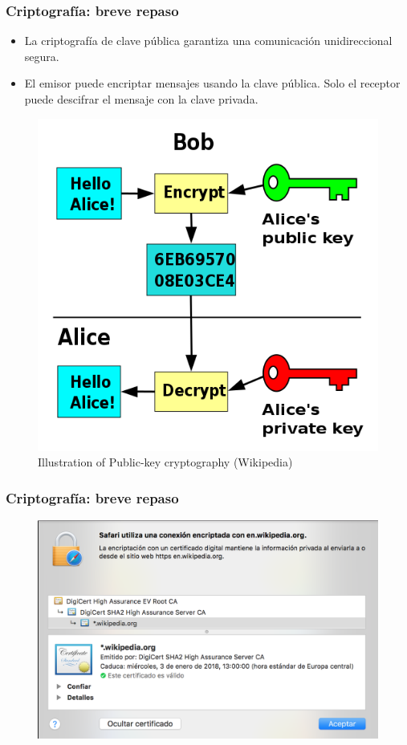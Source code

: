\documentclass[spanish, a4paper, 12pt, final, slideColor, nototal, colorBG, pdf, noaccumulate, darkblue] {beamer}
\begin{document}
\begin{frame}
    \frametitle{Criptografía: breve repaso}
    \begin{itemize}
    \item La criptografía de clave pública garantiza una comunicación unidireccional segura.
    \item El emisor puede encriptar mensajes usando la clave pública. Solo el receptor puede descifrar el mensaje con la clave privada.
    \end{itemize}
    \begin{figure}[!ht]
      \centering
      \includegraphics[scale=0.25]{Public-key-Wikipedia.png}
      \caption{Illustration of Public-key cryptography (Wikipedia)}
    \end{figure}
\end{frame}
\begin{frame}
    \frametitle{Criptografía: breve repaso}
    \begin{figure}[!ht]
      \centering
      \includegraphics[scale=0.5]{Certificado.png}
    \end{figure}
\end{frame}
\end{document}
